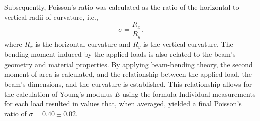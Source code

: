 \documentclass[a4paper,11pt]{article}
\begin{document}
\begin{table}[H]
  \centering
  \caption{Poisson's Ratio Summary Table}
\end{table}
\noindent

Subsequently, Poisson's ratio was calculated as the ratio of the horizontal to vertical radii of curvature, i.e.,
\begin{equation}
\sigma = \frac{R_x}{R_y}.
\end{equation}
where \(R_x\) is the horizontal curvature and \(R_y\) is the vertical curvature. The bending moment induced by the applied loads is also related to the beam's geometry and material properties. By applying beam-bending theory, the second moment of area is calculated, and the relationship between the applied load, the beam's dimensions, and the curvature is established. This relationship allows for the calculation of Young's modulus \(E\) using the formula
Individual measurements for each load resulted in values that, when averaged, yielded a final Poisson's ratio of \(\sigma = 0.40 \pm 0.02\).\\
\end{document}
